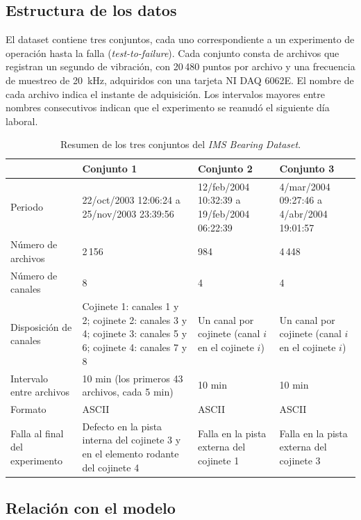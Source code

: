 \subsection{Estructura de los datos}

El dataset contiene tres conjuntos, cada uno correspondiente a un experimento de operación hasta la falla 
(\emph{test-to-failure}). Cada conjunto consta de archivos que registran un segundo de vibración, con 20\,480 
puntos por archivo y una frecuencia de muestreo de 20~kHz, adquiridos con una tarjeta NI DAQ 6062E. El nombre de 
cada archivo indica el instante de adquisición. Los intervalos mayores entre nombres consecutivos indican que el 
experimento se reanudó el siguiente día laboral.

\begin{table}[H]
\centering
\small
\renewcommand{\arraystretch}{1.3}
\begin{tabular}{|p{3.2cm}|p{3.8cm}|p{3.8cm}|p{3.8cm}|}
\hline
 & \textbf{Conjunto 1} & \textbf{Conjunto 2} & \textbf{Conjunto 3} \\ \hline
Periodo & 22/oct/2003 12:06:24 a 25/nov/2003 23:39:56 & 12/feb/2004 10:32:39 a 19/feb/2004 06:22:39 
& 4/mar/2004 09:27:46 a 4/abr/2004 19:01:57 \\ \hline
Número de archivos & 2\,156 & 984 & 4\,448 \\ \hline
Número de canales & 8 & 4 & 4 \\ \hline
Disposición de canales & Cojinete 1: canales 1 y 2; cojinete 2: canales 3 y 4; cojinete 3: canales 5 y 6; 
cojinete 4: canales 7 y 8 & Un canal por cojinete (canal $i$ en el cojinete $i$) & Un canal por cojinete 
(canal $i$ en el cojinete $i$) \\ \hline
Intervalo entre archivos & 10 min (los primeros 43 archivos, cada 5 min) & 10 min & 10 min \\ \hline
Formato & ASCII & ASCII & ASCII \\ \hline
Falla al final del experimento & Defecto en la pista interna del cojinete 3 y en el elemento rodante del cojinete 4 & 
Falla en la pista externa del cojinete 1 & Falla en la pista externa del cojinete 3 \\ \hline
\end{tabular}
\caption{Resumen de los tres conjuntos del \emph{IMS Bearing Dataset}.}
\label{tab:ims}
\end{table}

\subsection{Relación con el modelo}

